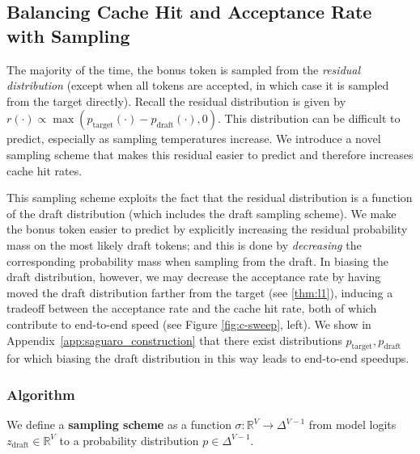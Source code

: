 \subsection{Balancing Cache Hit and Acceptance Rate with \Sys Sampling}
\label{sec:cache_sampling}



The majority of the time, the bonus token is sampled from the \textit{residual distribution} (except when all tokens are accepted, in which case it is sampled from the target directly). Recall the residual distribution is given by \(r(\cdot) \propto \max\left(p_{\mathrm{target}}(\cdot)-p_{\mathrm{draft}}(\cdot), 0\right)\).
This distribution can be difficult to predict, especially as sampling temperatures increase. 
We introduce a novel sampling scheme that makes this residual easier to predict and therefore increases cache hit rates. 

This sampling scheme exploits the fact that the residual distribution is a function of the draft distribution (which includes the draft sampling scheme).
We make the bonus token easier to predict by explicitly increasing the residual probability mass on the most likely draft tokens; and this is done by \textit{decreasing} the corresponding probability mass when sampling from the draft. 
In biasing the draft distribution, however, we may decrease the acceptance rate by having moved the draft distribution farther from the target (see \ref{thm:l1}), inducing a tradeoff between the acceptance rate and the cache hit rate, both of which contribute to end-to-end speed (see Figure \ref{fig:c-sweep}, left).
We show in Appendix~\ref{app:saguaro_construction} that there exist distributions $p_{\mathrm{target}}, p_{\mathrm{draft}}$ for which biasing the draft distribution in this way leads to end-to-end speedups.

\subsubsection{Algorithm}
\label{sec:cache_sampling_alg}

\begin{definition}
We define a \textbf{sampling scheme} as a function $\sigma\colon\mathbb{R}^V \rightarrow \Delta^{V-1}$ from model logits $z_{\mathrm{draft}} \in \mathbb{R}^V$ to a probability distribution $p\in \Delta^{V-1}$.
\end{definition}

